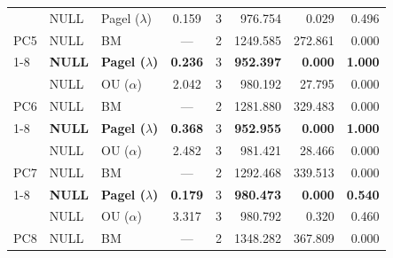 \begin{table}[!h]
\begin{tabular}[t]{lllccrrr}
 & NULL & Pagel ($\lambda$) & 0.159 & 3 & 976.754 & 0.029 & 0.496\\

\multirow{-3}{*}{\raggedright\arraybackslash PC5} & NULL & BM & --- & 2 & 1249.585 & 272.861 & 0.000\\
\cmidrule{1-8}
 & \textbf{NULL} & \textbf{Pagel ($\lambda$)} & \textbf{0.236} & 3 & \textbf{952.397} & \textbf{0.000} & \textbf{1.000}\\

 & NULL & OU ($\alpha$) & 2.042 & 3 & 980.192 & 27.795 & 0.000\\

\multirow{-3}{*}{\raggedright\arraybackslash PC6} & NULL & BM & --- & 2 & 1281.880 & 329.483 & 0.000\\
\cmidrule{1-8}
 & \textbf{NULL} & \textbf{Pagel ($\lambda$)} & \textbf{0.368} & 3 & \textbf{952.955} & \textbf{0.000} & \textbf{1.000}\\

 & NULL & OU ($\alpha$) & 2.482 & 3 & 981.421 & 28.466 & 0.000\\

\multirow{-3}{*}{\raggedright\arraybackslash PC7} & NULL & BM & --- & 2 & 1292.468 & 339.513 & 0.000\\
\cmidrule{1-8}
 & \textbf{NULL} & \textbf{Pagel ($\lambda$)} & \textbf{0.179} & 3 & \textbf{980.473} & \textbf{0.000} & \textbf{0.540}\\

 & NULL & OU ($\alpha$) & 3.317 & 3 & 980.792 & 0.320 & 0.460\\

\multirow{-3}{*}{\raggedright\arraybackslash PC8} & NULL & BM & --- & 2 & 1348.282 & 367.809 & 0.000\\
\bottomrule
\end{tabular}
\end{table}
